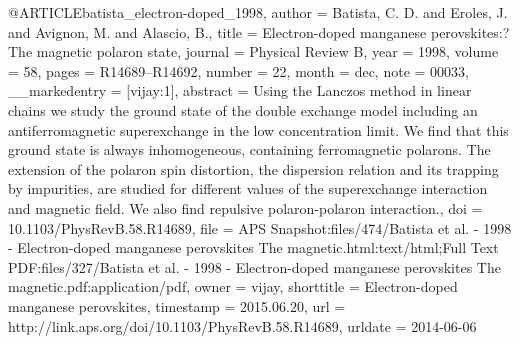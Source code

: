 @ARTICLE{batista_electron-doped_1998,
  author = {Batista, C. D. and Eroles, J. and Avignon, M. and Alascio, B.},
  title = {Electron-doped manganese perovskites:?{The} magnetic polaron state},
  journal = {Physical Review B},
  year = {1998},
  volume = {58},
  pages = {R14689--R14692},
  number = {22},
  month = dec,
  note = {00033},
  __markedentry = {[vijay:1]},
  abstract = {Using the Lanczos method in linear chains we study the ground state
	of the double exchange model including an antiferromagnetic superexchange
	in the low concentration limit. We find that this ground state is
	always inhomogeneous, containing ferromagnetic polarons. The extension
	of the polaron spin distortion, the dispersion relation and its trapping
	by impurities, are studied for different values of the superexchange
	interaction and magnetic field. We also find repulsive polaron-polaron
	interaction.},
  doi = {10.1103/PhysRevB.58.R14689},
  file = {APS Snapshot:files/474/Batista et al. - 1998 - Electron-doped manganese perovskites The magnetic.html:text/html;Full Text PDF:files/327/Batista et al. - 1998 - Electron-doped manganese perovskites The magnetic.pdf:application/pdf},
  owner = {vijay},
  shorttitle = {Electron-doped manganese perovskites},
  timestamp = {2015.06.20},
  url = {http://link.aps.org/doi/10.1103/PhysRevB.58.R14689},
  urldate = {2014-06-06}
}

